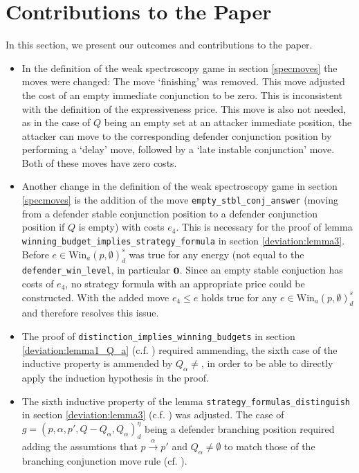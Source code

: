 \newpage
\section{Contributions to the Paper}
In this section, we present our outcomes and contributions to the paper.
\begin{itemize}
    \item In the definition of the weak spectroscopy game in section \ref{specmoves} the moves were changed: 
    The move `finishing' was removed. This move adjusted the cost of an empty immediate conjunction to be zero.
    This is inconsistent with the definition of the expressiveness price. This move is also not needed, as in the case of $Q$ being an empty set at an attacker immediate position, the attacker can move to the corresponding
    defender conjunction position by performing a `delay' move, followed by a `late instable conjunction' move. Both of these moves have zero costs.

    \item Another change in the definition of the weak spectroscopy game in section \ref{specmoves} is the addition of the move \texttt{empty\_stbl\_conj\_answer} (moving from a defender stable conjunction position to a defender conjunction
    position if $Q$ is empty) with costs $e_4$. This is necessary for the proof of lemma\\ 
    \texttt{winning\_budget\_implies\_strategy\_formula} in section \ref{deviation:lemma3}. Before 
    $e \in \text{Win}_a (p, \emptyset)_d^s $ was true for any energy (not equal to the \texttt{defender\_win\_level}, in particular $\bold{0}$. 
    Since an empty stable conjuction has costs of $e_4$, no strategy formula with an appropriate price could be constructed. 
    With the added move $e_4 \leq e $ holds true for any $e \in \text{Win}_a (p, \emptyset)_d^s $ and therefore resolves this issue.

    \item The proof of \texttt{distinction\_implies\_winning\_budgets} in section \ref{deviation:lemma1_Q_a} 
    (c.f. \cite[lemma $1$]{bisping2023lineartimebranchingtime}) required ammending, the sixth case
    of the inductive property is ammended by $Q_\alpha \neq {}$, in order to be able to directly
    apply the induction hypothesis in the proof.

    \item The sixth inductive property of the lemma \texttt{strategy\_formulas\_distinguish} in section \ref{deviation:lemma3} 
    (c.f. \cite[lemma $3$]{bisping2023lineartimebranchingtime}) was adjusted.
    The case of $g=(p,\alpha ,p', Q- Q_\alpha, Q_\alpha)_d^\eta$ being a defender branching position
    required adding the assumtions that $p \overset{\alpha}{\longrightarrow} p'$ and $Q_\alpha \neq \emptyset$
    to match those of the branching conjunction move rule (cf. \cite[p. 13]{bisping2023lineartimebranchingtime}). 


\end{itemize}
